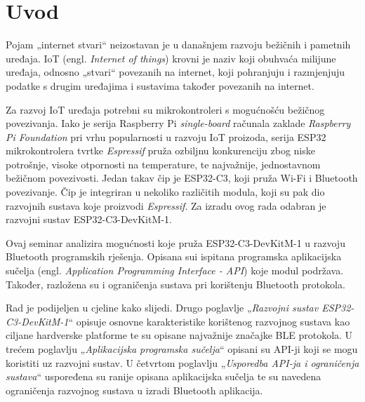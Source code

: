 \chapter{Uvod}

Pojam „internet stvari“ neizostavan je u današnjem razvoju bežičnih i pametnih uređaja. IoT (engl. \textit{Internet of things}) krovni je naziv koji obuhvaća milijune uređaja, odnosno „stvari“ povezanih na internet, koji pohranjuju i razmjenjuju podatke s drugim uređajima i sustavima također povezanih na internet. \cite{what_is_iot} 

Za razvoj IoT uređaja potrebni su mikrokontroleri s mogućnošću bežičnog povezivanja. Iako je serija Raspberry Pi \textit{single-board} računala zaklade \textit{Raspberry Pi Foundation} pri vrhu popularnosti u razvoju IoT proizoda, serija ESP32 mikrokontrolera tvrtke \textit{Espressif} pruža ozbiljnu konkurenciju zbog niske potrošnje, visoke otpornosti na temperature, te najvažnije, jednostavnom bežičnom povezivosti. \cite{rasp_pi} \cite{rasp_pi_esp} Jedan takav čip je ESP32-C3, koji pruža Wi-Fi i Bluetooth povezivanje. Čip je integriran u nekoliko različitih modula, koji su pak dio razvojnih sustava koje proizvodi \textit{Espressif}. Za izradu ovog rada odabran je razvojni sustav ESP32-C3-DevKitM-1.

Ovaj seminar analizira mogućnosti koje pruža ESP32-C3-DevKitM-1 u razvoju Bluetooth programskih rješenja. Opisana sui ispitana  programska aplikacijska sučelja (engl. \textit{Application Programming Interface - API}) koje modul podržava. Također, razložena su i ograničenja sustava pri korištenju Bluetooth protokola.

Rad je podijeljen u cjeline kako slijedi. Drugo poglavlje „\textit{Razvojni sustav ESP32-C3-DevKitM-1}“ opisuje osnovne karakteristike korištenog razvojnog sustava kao ciljane hardverske platforme te su opisane najvažnije značajke BLE protokola. U trećem poglavlju „\textit{Aplikacijska programska sučelja}“ opisani su API-ji koji se mogu koristiti uz razvojni sustav. U četvrtom poglavlju „\textit{Usporedba API-ja i ograničenja sustava}“ uspoređena su ranije opisana aplikacijska sučelja te su navedena ograničenja razvojnog sustava u izradi Bluetooth aplikacija.

\eject